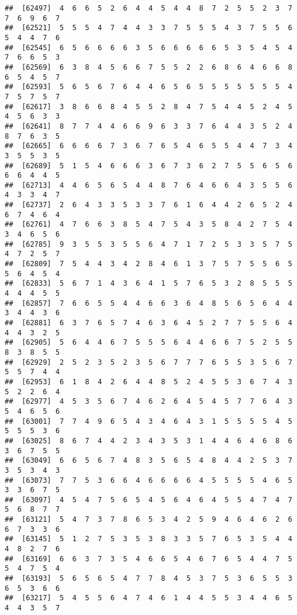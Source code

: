 \documentclass[
]{book}
\begin{document}
\begin{verbatim}
##  [62497]  4  6  6  5  2  6  4  4  5  4  4  8  7  2  5  5  2  3  7  7  6  9  6  7
##  [62521]  5  5  5  4  7  4  4  3  3  7  5  5  5  4  3  7  5  5  6  5  4  4  7  6
##  [62545]  6  5  6  6  6  6  3  5  6  6  6  6  6  5  3  5  4  5  4  7  6  6  5  3
##  [62569]  6  3  8  4  5  6  6  7  5  5  2  2  6  8  6  4  6  6  8  6  5  4  5  7
##  [62593]  5  6  5  6  7  6  4  4  6  5  6  5  5  5  5  5  5  5  4  7  5  7  5  7
##  [62617]  3  8  6  6  8  4  5  5  2  8  4  7  5  4  4  5  2  4  5  4  5  6  3  3
##  [62641]  8  7  7  4  4  6  6  9  6  3  3  7  6  4  4  3  5  2  4  8  7  6  3  5
##  [62665]  6  6  6  6  7  3  6  7  6  5  4  6  5  5  4  4  7  3  4  3  5  5  3  5
##  [62689]  5  1  5  4  6  6  6  3  6  7  3  6  2  7  5  5  6  5  6  6  6  4  4  5
##  [62713]  4  4  6  5  6  5  4  4  8  7  6  4  6  6  4  3  5  5  6  4  3  3  4  7
##  [62737]  2  6  4  3  3  5  3  3  7  6  1  6  4  4  2  6  5  2  4  6  7  4  6  4
##  [62761]  4  7  6  6  3  8  5  4  7  5  4  3  5  8  4  2  7  5  4  3  4  6  5  6
##  [62785]  9  3  5  5  3  5  5  6  4  7  1  7  2  5  3  3  5  7  5  4  7  2  5  7
##  [62809]  7  5  4  4  3  4  2  8  4  6  1  3  7  5  7  5  5  6  5  5  6  4  5  4
##  [62833]  5  6  7  1  4  3  6  4  1  5  7  6  5  3  2  8  5  5  5  4  4  4  5  5
##  [62857]  7  6  6  5  5  4  4  6  6  3  6  4  8  5  6  5  6  4  4  3  4  4  3  6
##  [62881]  6  3  7  6  5  7  4  6  3  6  4  5  2  7  7  5  5  6  4  4  4  3  2  5
##  [62905]  5  6  4  4  6  7  5  5  5  6  4  4  6  6  7  5  2  5  5  8  3  8  5  5
##  [62929]  2  5  2  3  5  2  3  5  6  7  7  7  6  5  5  3  5  6  7  5  5  7  4  4
##  [62953]  6  1  8  4  2  6  4  4  8  5  2  4  5  5  3  6  7  4  3  5  2  2  6  4
##  [62977]  4  5  3  5  6  7  4  6  2  6  4  5  4  5  7  7  6  4  3  5  4  6  5  6
##  [63001]  7  7  4  9  6  5  4  3  4  6  4  3  1  5  5  5  5  4  5  5  5  5  3  6
##  [63025]  8  6  7  4  4  2  3  4  3  5  3  1  4  4  6  4  6  8  6  3  6  7  5  5
##  [63049]  6  6  5  6  7  4  8  3  5  6  5  4  8  4  4  2  5  3  7  3  5  3  4  3
##  [63073]  7  7  5  3  6  6  4  6  6  6  6  4  5  5  5  5  4  6  5  3  3  6  7  5
##  [63097]  4  5  4  7  5  6  5  4  5  6  4  6  4  5  5  4  7  4  7  5  6  8  7  7
##  [63121]  5  4  7  3  7  8  6  5  3  4  2  5  9  4  6  4  6  2  6  6  7  3  3  6
##  [63145]  5  1  2  7  5  3  5  3  8  3  3  5  7  6  5  3  5  4  4  4  8  2  7  6
##  [63169]  6  6  3  7  3  5  4  6  6  5  4  6  7  6  5  4  4  7  5  5  4  7  5  4
##  [63193]  5  6  5  6  5  4  7  7  8  4  5  3  7  5  3  6  5  5  3  6  5  3  6  6
##  [63217]  5  4  5  5  6  4  7  4  6  1  4  4  5  5  3  4  4  6  5  4  4  3  5  7

\end{verbatim}
\end{document}
